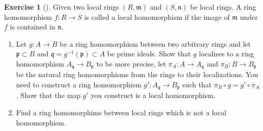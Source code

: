 \documentclass[reqno]{amsart}
\theoremstyle{definition}
\newtheorem{exercise}[theorem]{Exercise}
\theoremstyle{remark}
\begin{document}
    \begin{exercise}[]
        Given two local rings $\left( R,
        \mathfrak{m} \right) $ and
        $\left( S, \mathfrak{n} \right) $ be local rings.
        A ring homomorphism
        $f \colon R \to S$ is called a local
        homomorphism if the image of
        $\mathfrak{m}$ under $f$ is contained in
        $\mathfrak{n}$.
        \begin{enumerate}
            \item Let $g \colon A \to B$ be a ring
                homomorphism between two arbitrary
                rings and let 
                $\mathfrak{p} \subset B$ and
                $\mathfrak{q} = g^{-1}(\mathfrak{p}) \subset A$ be
                prime ideals. Show that
                $g$ localizes to a ring homomorphism
                $A_{\mathfrak{q}} \to 
                B_{\mathfrak{p}}$ to be more precise, let
                $\pi_{A} \colon A \to A_{\mathfrak{q}}$ 
                and $\pi_{B} \colon B \to 
                B_{\mathfrak{p}}$ be the natural ring
                homomorphisms from the
                rings to their localizations. You need
                to construct a ring homomorphism
                $g' \colon
                A_{\mathfrak{q}} \to 
                B_{\mathfrak{p}}$ such that
                $\pi_{B} \circ g = g' \circ \pi_A$. Show that
                the map $g'$ you construct is a local
                homomorphism.
            \item Find a ring homomorphims between
                local rings which is not a local
                homomorphism.
        \end{enumerate}
    \end{exercise}
\end{document}
